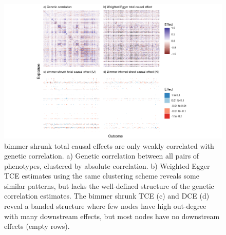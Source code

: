 \documentclass{article}
\begin{document}
\newpage
\begin{figure}[H]\label{figureS5}
\includegraphics[width=\textwidth]{figures/figure_S5.png}
\caption{bimmer shrunk total causal effects are only weakly correlated with genetic correlation.
a) Genetic correlation between all pairs of phenotypes, clustered by absolute correlation. b)
Weighted Egger TCE estimates using the same clustering scheme reveals some similar patterns, but
lacks the well-defined structure of the genetic correlation estimates. The bimmer shrunk TCE (c)
and DCE (d) reveal a banded structure where few nodes have high out-degree with many downstream
effects, but most nodes have no downstream effects (empty rows).
}
\end{figure}
\end{document}
